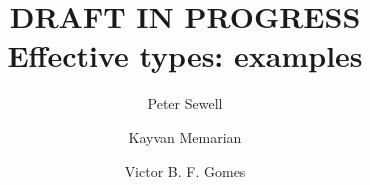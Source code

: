 \documentclass[12pt,acmsmall,review,screen]{acmart}\settopmatter{printfolios=true,printccs=false,printacmref=false}
\newif\ifWGfourteennumber
\begin{document}
\ifWGfourteennumber
\fancypagestyle{firstpagestyle}{%
\fancyhf{} %
\fancyhead[C]{ISO/IEC JTC1/SC22/WG14 N2311, 2018-11-09} %
\renewcommand{\headrulewidth}{0pt}
\renewcommand{\footrulewidth}{0pt}}
\thispagestyle{plain}
\fi

\title[Effective types: examples]{DRAFT IN PROGRESS\\Effective types: examples}


\authorsaddresses{}

\author{Peter Sewell}

 \author{Kayvan Memarian}
% 
% 
 \author{Victor B. F. Gomes}

\renewcommand{\shortauthors}{Sewell, Memarian, Gomes}

\end{document}
